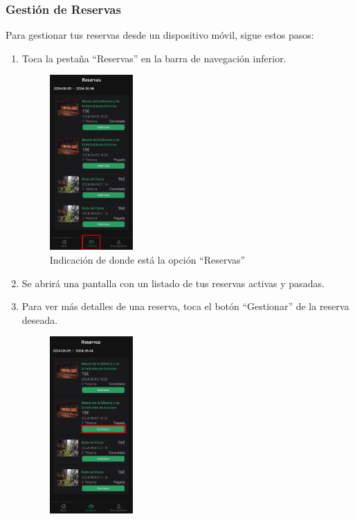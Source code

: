 \subsubsection{Gestión de Reservas}
Para gestionar tus reservas desde un dispositivo móvil, sigue estos pasos:
\begin{enumerate}
	\item Toca la pestaña “Reservas” en la barra de navegación inferior.
	      \begin{figure}[H]
		      \centering
		      \includegraphics[width=0.3\textwidth]{7-Construccion/Manuales/app/P1-GestionReserva.png}
		      \caption{Indicación de donde está la opción “Reservas” }
	      \end{figure}
	\item Se abrirá una pantalla con un listado de tus reservas activas y pasadas.
	\item Para ver más detalles de una reserva, toca el botón “Gestionar” de la reserva deseada.
	      \begin{figure}[H]
		      \centering
		      \includegraphics[width=0.3\textwidth]{7-Construccion/Manuales/app/P2-GestionReserva.png}

\end{figure}
\end{enumerate}
